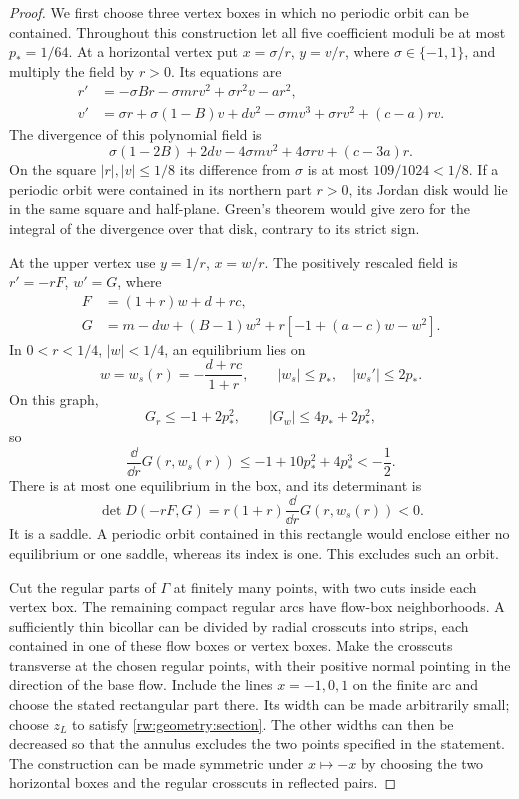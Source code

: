 \begin{proof}
We first choose three vertex boxes in which no periodic orbit can be
contained.  Throughout this construction let all five coefficient
moduli be at most $p_*=1/64$.
At a horizontal vertex put $x=\sigma/r$, $y=v/r$, where
$\sigma\in\{-1,1\}$, and multiply the field by $r>0$.  Its equations
are
\[
 \begin{aligned}
 r'&=-\sigma Br-\sigma mrv^2+\sigma r^2v-ar^2,\\
 v'&=\sigma r+\sigma(1-B)v+dv^2-\sigma mv^3
          +\sigma rv^2+(c-a)rv.
 \end{aligned}
\]
The divergence of this polynomial field is
\[
 \sigma(1-2B)+2dv-4\sigma mv^2+4\sigma rv+(c-3a)r.
\]
On the square $|r|,|v|\le1/8$ its difference from $\sigma$ is at
most $109/1024<1/8$.  If a periodic orbit were contained in its
northern part $r>0$, its Jordan disk would lie in the same square
and half-plane.  Green's theorem would give zero for the integral
of the divergence over that disk, contrary to its strict sign.

At the upper vertex use $y=1/r$, $x=w/r$.  The positively rescaled
field is $r'=-rF$, $w'=G$, where
\[
 \begin{aligned}
 F&=(1+r)w+d+rc,\\
 G&=m-dw+(B-1)w^2+r[-1+(a-c)w-w^2].
 \end{aligned}
\]
In $0<r<1/4$, $|w|<1/4$, an equilibrium lies on
\[
 w=w_s(r)=-\frac{d+rc}{1+r},\qquad
 |w_s|\le p_*,\quad |w_s'|\le2p_*.
\]
On this graph,
\[
 G_r\le-1+2p_*^2,\qquad |G_w|\le4p_*+2p_*^2,
\]
so
\[
 \frac{\dd}{\dd r}G(r,w_s(r))
 \le-1+10p_*^2+4p_*^3<-\frac12.
\]
There is at most one equilibrium in the box, and its determinant is
\[
 \det D(-rF,G)
 =r(1+r)\frac{\dd}{\dd r}G(r,w_s(r))<0.
\]
It is a saddle.  A periodic orbit contained in this rectangle would
enclose either no equilibrium or one saddle, whereas its index is one.
This excludes such an orbit.

Cut the regular parts of $\Gamma$ at finitely many points, with two
cuts inside each vertex box.  The remaining compact regular arcs have
flow-box neighborhoods.  A sufficiently thin bicollar can be divided
by radial crosscuts into strips, each contained in one of these flow
boxes or vertex boxes.  Make the crosscuts transverse at the chosen
regular points, with their positive normal pointing in the direction
of the base flow.  Include the lines $x=-1,0,1$ on the finite arc
and choose the stated rectangular part there.  Its width can be made
arbitrarily small; choose $z_L$ to satisfy
\eqref{rw:geometry:section}.  The other widths can then be decreased
so that the annulus excludes the two points specified in the statement.
The construction can be made symmetric under $x\mapsto-x$ by choosing
the two horizontal boxes and the regular crosscuts in reflected pairs.


\end{proof}
